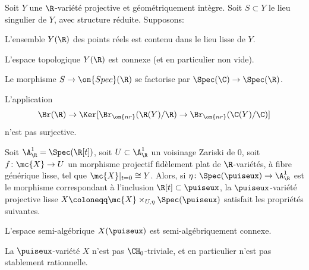 \begin{thm}\label{generateur}
Soit $Y$ une $\R$-variété projective et géométriquement intègre. Soit $S\subset Y$ le lieu singulier de $Y$, avec structure réduite. Supposons:
\begin{enumeratea}
\item\label{generateura}
L'ensemble $Y(\R)$ des points réels est contenu dans le lieu lisse de $Y$.
\item\label{generateurb}
L'espace topologique $Y(\R)$ est connexe (et en particulier non vide).
\item\label{generateurc}
Le morphisme $S\to \on{Spec}(\R)$ se factorise par $\Spec(\C)\to\Spec(\R)$.
\item\label{generateurd}
L'application
\[\Br(\R) \to \Ker [\Br_{\on{nr}}(\R(Y)/\R) \to \Br_{\on{nr}}(\C(Y)/\C)]\] n'est pas
surjective.
\end{enumeratea}

Soit $\A^1_\R=\Spec( \R[t])$, soit $U\subset \A^1_\R$ un voisinage Zariski de $0$, soit $f\colon \mc{X}\to U$ un morphisme projectif fidèlement plat de $\R$-variétés, à fibre générique lisse, tel que $\mc{X}|_{t=0}\cong Y$. Alors, si $\eta\colon \Spec(\puiseux)\to \A^1_\R$ est le morphisme correspondant à l'inclusion $\R[t]\subset \puiseux$, la $\puiseux$-variété projective lisse $X\coloneqq \mc{X}\times_{U,\eta}\Spec(\puiseux)$ satisfait les propriétés suivantes.

\begin{enumeratei}
\item\label{generateuri}
L'espace semi-algébrique $X(\puiseux)$ est semi-algébriquement connexe.
\item\label{generateurii}
La $\puiseux$-variété $X$ n'est pas $\CH_0$-triviale, et en particulier
n'est pas stablement rationnelle.
\end{enumeratei}
\end{thm}

